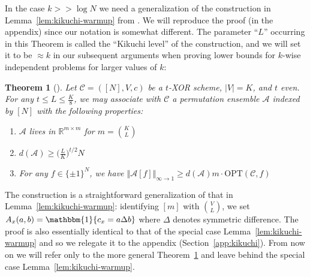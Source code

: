 \documentclass[11pt]{article}
\newtheorem{theorem}{Theorem}
\newcommand{\norm}[1]{\Vert #1 \Vert}
\newcommand{\Opt}{\mathrm{OPT}}
\newcommand{\N}{[N]}
\begin{document}
In the case $k >> \log N$ we need a generalization of the construction in Lemma~\ref{lem:kikuchi-warmup} from \cite{wein2019kikuchi,smoothed}. We will reproduce the proof (in the appendix) since our notation is somewhat different. The parameter ``$L$'' occurring in this Theorem is called the ``Kikuchi level'' of the construction, and we will set it to be $\approx k$ in our subsequent arguments when proving lower bounds for $k$-wise independent problems for larger values of $k$:
\begin{theorem}[\cite{wein2019kikuchi,smoothed}]\label{thm:kikuchi}
Let $\mathcal{C} = (\N,V,c)$ be a $t$-XOR scheme, $|V|=K$, and $t$ even. For any $t \leq L \leq \frac{K}{8}$, we may associate with $\mathcal{C}$ a permutation ensemble
$\mathcal{A}$ indexed by $\N$ with the following properties:
\begin{enumerate}
	\item $\mathcal{A}$ lives in $\mathbb{R}^{m \times m}$ for $m = \binom{K}{L}$
	\item $d(\mathcal{A}) \geq \bigl(\frac{L}{K}\bigr)^{t/2} N$
	\item For any $f\in \{\pm 1\}^N$, we have $\norm{\mathcal{A}[f]}_{\infty \to 1} \geq d(\mathcal{A}) m \cdot \Opt(\mathcal{C},f)$
\end{enumerate}
\end{theorem}
The construction is a straightforward generalization of that in Lemma~\ref{lem:kikuchi-warmup}: identifying $[m]$ with $\binom{V}{L}$, we set $A_x(a,b) = \mathbbm{1}\{ c_x = a \Delta b\}$ where $\Delta$ denotes symmetric difference. The proof is also essentially identical to that of the special case Lemma~\ref{lem:kikuchi-warmup} and so we relegate it to the appendix (Section~\ref{app:kikuchi}). From now on we will refer only to the more general Theorem~\ref{thm:kikuchi} and leave behind the special case Lemma~\ref{lem:kikuchi-warmup}.
\end{document}
